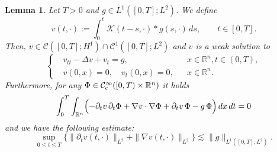 \documentclass[11pt,reqno]{amsart}
\newtheorem{lemma}{Lemma}[section]
\begin{document}
	\begin{lemma}\label{regularity_K}
		Let $T>0$ and $g\in L^1([0,T];L^2)$. We define
		\[
		v(t,\cdot):=\int_0^t\mathcal K(t-s,\cdot)\ast g(s,\cdot)\,ds,
		\qquad t\in[0,T].
		\]
		Then, $v\in \mathcal{C}([0,T];H^1)\cap \mathcal{C}^1([0,T];L^2)$ and $v$ is a weak solution to 
		\[
		\left\{
		\begin{aligned}
			&v_{tt}-\Delta v+ v_t= g,&&x\in \mathbb R^n,t\in (0,T),\\
			&v(0,x)=0, \quad v_t(0,x)=0,&&x\in \mathbb R^n.
		\end{aligned}
		\right.
		\]
		Furthermore, for any
		$\Phi\in \mathcal{C}^\infty_{\rm c}([0,T)\times\mathbb R^n)$ it holds
		\begin{equation}\label{duhamel_distribution_identity}
			\int_0^T\int_{\mathbb R^n}\Bigl(-\partial_tv\,\partial_t\Phi+\nabla v\cdot\nabla\Phi+\partial_tv\,\Phi- g\,\Phi\Bigr)\,dx\,dt=0
		\end{equation}
		and we have the following estimate:
		\begin{equation}\label{Energy_Est}
			\sup_{0\leq t\leq T}\big\{\|\partial_tv(t,\cdot)\|_{L^2}+\|\nabla v(t,\cdot)\|_{L^2}\big\}\lesssim \|g\|_{L^1([0,T];L^2)}.
		\end{equation}
	\end{lemma}
\end{document}
